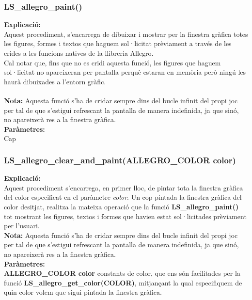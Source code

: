 \documentclass[11pt]{article}
\begin{document}
\pagebreak
\subsubsection{LS\_allegro\_paint()}
\textbf{Explicació:}\\
Aquest procediment, s'encarrega de dibuixar i mostrar per la finestra gràfica totes les figures, formes i textos que haguem sol·licitat prèviament a través de les crides a les funcions natives de la llibreria Allegro.\\
Cal notar que, fins que no es cridi aquesta funció, les figures que haguem sol·licitat no apareixeran per pantalla perquè estaran en memòria però ningú les haurà dibuixades a l'entorn gràfic.\\\\
\textbf{Nota:} Aquesta funció s'ha de cridar sempre dins del bucle infinit del propi joc per tal de que s'estigui refrescant la pantalla de manera indefinida, ja que sinó, no apareixerà res a la finestra gràfica.\\

\noindent \textbf{Paràmetres:}\\
Cap

\subsubsection{LS\_allegro\_clear\_and\_paint(ALLEGRO\_COLOR color)}
\textbf{Explicació:}\\
Aquest procediment s'encarrega, en primer lloc, de pintar tota la finestra gràfica del color especificat en el paràmetre \textit{color}. Un cop pintada la finestra gràfica del color desitjat, realitza la mateixa operació que la funció \textbf{LS\_allegro\_paint()} tot mostrant les figures, textos i formes que havien estat sol·licitades prèviament per l'usuari.\\

\noindent \textbf{Nota:} Aquesta funció s'ha de cridar sempre dins del bucle infinit del propi joc per tal de que s'estigui refrescant la pantalla de manera indefinida, ja que sinó, no apareixerà res a la finestra gràfica.\\

\noindent \textbf{Paràmetres:}\\
\noindent \textbf{ALLEGRO\_COLOR color} constants de color, que ens són facilitades per la funció \textbf{LS\_allegro\_get\_color(COLOR)}, mitjançant la qual especifiquem de quin color volem que sigui pintada la finestra gràfica.
\end{document}
